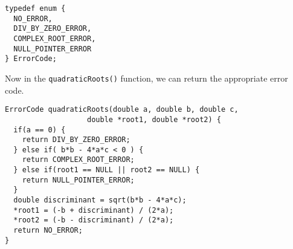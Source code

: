 \begin{verbatim}
typedef enum {
  NO_ERROR,
  DIV_BY_ZERO_ERROR,
  COMPLEX_ROOT_ERROR,
  NULL_POINTER_ERROR
} ErrorCode;
\end{verbatim}

Now in the \texttt{quadraticRoots()} function, we can
return the appropriate error code.

\begin{verbatim}
ErrorCode quadraticRoots(double a, double b, double c, 
                   double *root1, double *root2) {
  if(a == 0) {
    return DIV_BY_ZERO_ERROR;
  } else if( b*b - 4*a*c < 0 ) {
    return COMPLEX_ROOT_ERROR;
  } else if(root1 == NULL || root2 == NULL) {
    return NULL_POINTER_ERROR;
  }
  double discriminant = sqrt(b*b - 4*a*c);
  *root1 = (-b + discriminant) / (2*a);
  *root2 = (-b - discriminant) / (2*a);
  return NO_ERROR;
}
\end{verbatim}
